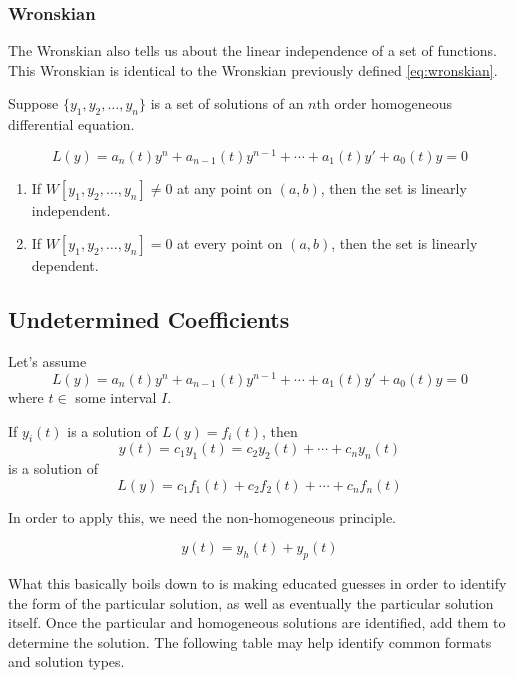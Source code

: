         \subsubsection{Wronskian}
        The Wronskian also tells us about the linear independence of a set of functions. This Wronskian is identical to the Wronskian previously defined \eqref{eq:wronskian}.

        Suppose $\{y_1, y_2, \dots, y_n \}$ is a set of solutions of an $n$th order homogeneous differential equation.

            \[
                L(y) = a_n(t)y^n + a_{n-1}(t)y^{n-1} + \cdots + a_1 (t)y\prime + a_0 (t)y = 0
            \]
            \begin{enumerate}
                \item If $W[y_1, y_2, \dots, y_n] \neq 0$ at any point on $(a, b)$, then the set is linearly independent.
                \item If $W[y_1, y_2, \dots, y_n] = 0$ at every point on $(a, b)$, then the set is linearly dependent.
            \end{enumerate}

    \subsection{Undetermined Coefficients}\label{sec:2decoefficients}
    Let's assume
        \[ L(y) = a_n(t)y^n + a_{n-1}(t)y^{n-1} + \cdots + a_1 (t)y\prime + a_0 (t)y = 0 \]
    where $t \in $ some interval $I$.

    If $y_i(t)$ is a solution of $L(y) = f_i(t)$, then
        \[ y(t) = c_1 y_1(t) = c_2 y_2(t) + \cdots + c_n y_n(t) \]
    is a solution of
        \[ L(y) = c_1 f_1(t) + c_2 f_2(t) + \cdots + c_n f_n(t) \]

    In order to apply this, we need the non-homogeneous principle.

    \begin{thm}
        \[
            y(t) = y_h(t) + y_p(t)
        \]
    \end{thm}

    What this basically boils down to is making educated guesses in order to identify the form of the particular solution, as well as eventually the particular solution itself. Once the particular and homogeneous solutions are identified, add them to determine the solution. The following table may help identify common formats and solution types.

